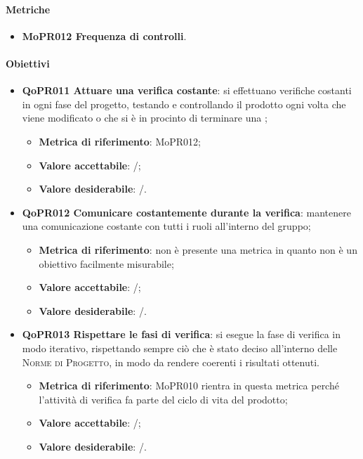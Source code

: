\documentclass[../piano-di-qualifica.tex]{subfiles}
\begin{document}
\paragraph{Metriche}
\label{sub:metriche_4}
\begin{itemize}
    \item \textbf{MoPR012 Frequenza di controlli}.
\end{itemize}

\paragraph{Obiettivi}
\label{sub:obiettivi_4}
\begin{itemize}
    \item \textbf{QoPR011 Attuare una verifica costante}: si effettuano verifiche costanti in ogni fase del progetto, testando e controllando il prodotto ogni volta che viene modificato o che si è in procinto di terminare una ;
    \begin{itemize}
        \item \textbf{Metrica di riferimento}: MoPR012;
        \item \textbf{Valore accettabile}: /; %
        \item \textbf{Valore desiderabile}: /.
    \end{itemize}
    \item \textbf{QoPR012 Comunicare costantemente durante la verifica}: mantenere una comunicazione costante con tutti i ruoli all'interno del gruppo;
    \begin{itemize}
        \item \textbf{Metrica di riferimento}: non è presente una metrica in quanto non è un obiettivo facilmente misurabile;
        \item \textbf{Valore accettabile}: /; %
        \item \textbf{Valore desiderabile}: /.
    \end{itemize}
    \item \textbf{QoPR013 Rispettare le fasi di verifica}: si esegue la fase di verifica in modo iterativo, rispettando sempre ciò che è stato deciso all'interno delle \textsc{Norme di Progetto}, in modo da rendere coerenti i risultati ottenuti.
        \begin{itemize}
            \item \textbf{Metrica di riferimento}: MoPR010 rientra in questa metrica perché l'attività di verifica fa parte del ciclo di vita del prodotto;
            \item \textbf{Valore accettabile}: /; %
            \item \textbf{Valore desiderabile}: /.
        \end{itemize}
\end{itemize}
\end{document}
